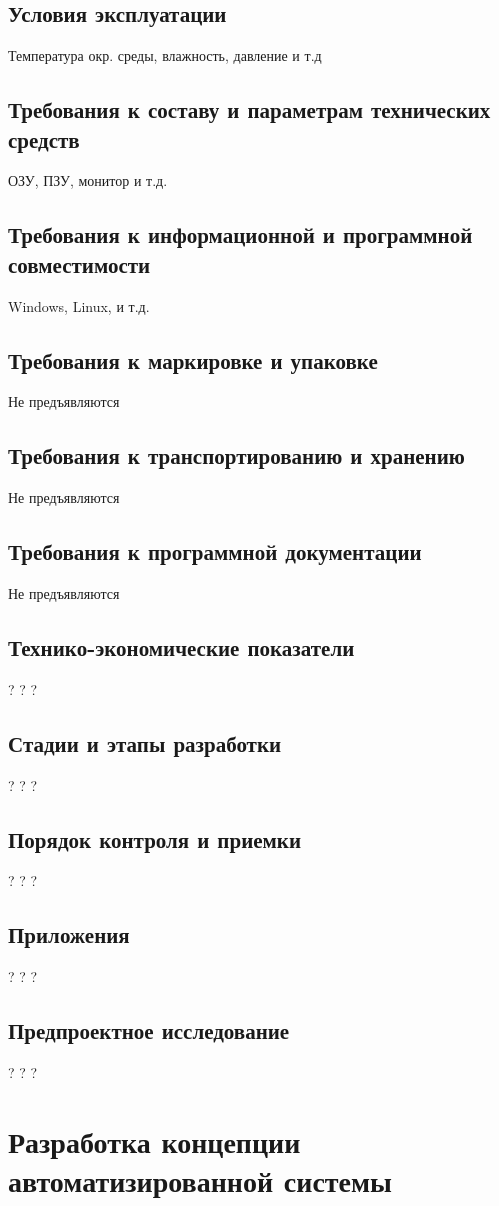 \documentclass[14pt,oneside,final]{extreport}
\begin{document}
		\section{Условия эксплуатации}
	    Температура окр. среды, влажность, давление и т.д
		\section{Требования к составу и параметрам технических средств}
	    ОЗУ, ПЗУ, монитор и т.д.
		\section{Требования к информационной и программной совместимости}
	Windows, Linux, и т.д.
	\section{Требования к маркировке и упаковке}
	     Не предъявляются
	\section{Требования к транспортированию и хранению}
	    Не предъявляются
	\section{Требования к программной документации}
	    Не предъявляются
		\section{Технико-экономические показатели}
	    ? ? ?
		\section{Стадии и этапы разработки}
	    ? ? ?
	\section{Порядок контроля и приемки}
	    ? ? ?
		\section{Приложения}
	    ? ? ?
		\section{Предпроектное исследование}
	    ? ? ?
	\chapter{Разработка концепции автоматизированной системы}
\end{document}
